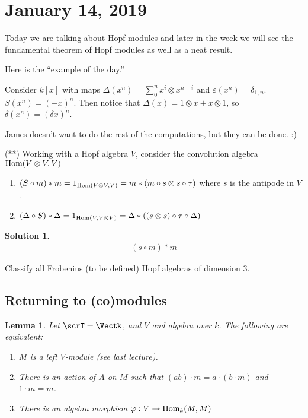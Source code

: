 \documentclass[12pt]{article}
\theoremstyle{break}
\theoremstyle{nonumberbreak}
\newtheorem{sol}{Solution}
\theoremstyle{changebreak}
\newtheorem{lem}[thm]{Lemma}
\theoremstyle{break}
\theoremstyle{nonumberbreak}
\theoremstyle{nonumberplain}
\theoremstyle{change}
\newcommand*{\Hom}{\ensuremath\text{Hom}}
\begin{document}
\section{January 14, 2019}
Today we are talking about Hopf modules and later in the week we will see the fundamental
theorem of Hopf modules as well as a neat result.

Here is the ``example of the day.''
\begin{ex}
	Consider $k[x]$ with maps $\Delta(x^n)=\sum_0^nx^i\otimes x^{n-i}$ and $\varepsilon(x^n)=\delta_{1,n}$. 
	$S(x^n)=(-x)^n$. Then notice that $\Delta(x)=1\otimes x+x\otimes 1$, so $\delta(x^n)=(\delta x)^n$.

	James doesn't want to do the rest of the computations, but they can be done. :)
\end{ex}

\begin{prob}\label{prob-4.1}
	(**) Working with a Hopf algebra $V$, consider the convolution algebra $\Hom(V\otimes V,V)$
	\begin{enumerate}
		\item $(S\circ m)\ast m=1_{\Hom(V\otimes V,V)}=m\ast(m\circ s\otimes s\circ\tau)$ where $s$ is the antipode in $V$.
		\item $(\Delta\circ S)\ast \Delta=1_{\Hom(V,V\otimes V)}=\Delta\ast((s\otimes s)\circ\tau\circ \Delta)$
	\end{enumerate}
\end{prob}
\begin{sol}
	\begin{align*}
		(s\circ m)\ast m
	\end{align*}
\end{sol}
\begin{prob}
	Classify all Frobenius (to be defined) Hopf algebras of dimension 3.
\end{prob}

\subsection{Returning to (co)modules}\label{subsec-comod}
\begin{lem}
	Let $\scrT=\Vectk$, and $V$ and algebra over $k$. The following are equivalent:
	\begin{enumerate}
		\item $M$ is a left $V$-module (see last lecture).
		\item There is an action of $A$ on $M$ such that $(ab)\cdot m=a\cdot (b\cdot m)$ and $1\cdot m=m$.
		\item There is an algebra morphism $\varphi:V\to\Hom_k(M,M)$
	\end{enumerate}
\end{lem}
\end{document}

